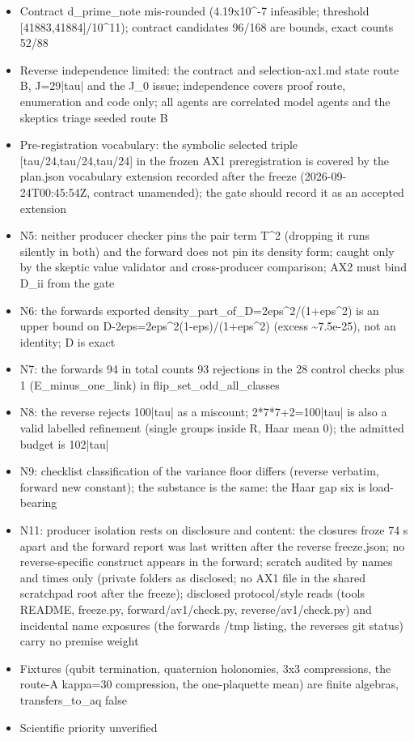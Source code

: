 \begin{gatequote}
\begin{itemize}
constant
\item Contract d\_prime\_note mis-rounded (4.19x10\textasciicircum{}-7
infeasible; threshold [41883,41884]/10\textasciicircum{}11); contract
candidates 96/168 are bounds, exact counts 52/88
\item Reverse independence limited: the contract and selection-ax1.md state
route B, J\textquotesingle{}=29|tau| and the J\_0 issue; independence covers
proof route, enumeration and code only; all agents are correlated model agents
and the skeptic\textquotesingle{}s triage seeded route B
\item Pre-registration vocabulary: the symbolic selected triple
[\textquotesingle{}tau/24\textquotesingle{},\textquotesingle{}tau/24\textquotesingle{},\textquotesingle{}tau/24\textquotesingle{}]
in the frozen AX1 preregistration is covered by the plan.json vocabulary
extension recorded after the freeze (2026-09-24T00:45:54Z, contract
unamended); the gate should record it as an accepted extension
\item N5: neither producer checker pins the pair term
T\textquotesingle{}\textasciicircum{}2 (dropping it runs silently in both) and
the forward does not pin its density form; caught only by the skeptic value
validator and cross-producer comparison; AX2 must bind D\textquotesingle{}\_ii
from the gate
\item N6: the forward\textquotesingle{}s exported
density\_part\_of\_D=2eps\textasciicircum{}2/(1+eps\textasciicircum{}2) is an
upper bound on
D-2eps=2eps\textasciicircum{}2(1-eps)/(1+eps\textasciicircum{}2) (excess
\textasciitilde{}7.5e-25), not an identity; D is exact
\item N7: the forward\textquotesingle{}s \textquotesingle{}94 in
total\textquotesingle{} counts 93 rejections in the 28 control checks plus 1
(E\_minus\_one\_link) in flip\_set\_odd\_all\_classes
\item N8: the reverse rejects 100|tau| as a miscount; 2*7*7+2=100|tau| is also
a valid labelled refinement (single groups inside R, Haar mean 0); the
admitted budget is 102|tau|
\item N9: checklist classification of the variance floor differs (reverse
verbatim, forward new constant); the substance is the same: the Haar gap six
is load-bearing
\item N11: producer isolation rests on disclosure and content: the closures
froze 74 s apart and the forward report was last written after the reverse
freeze.json; no reverse-specific construct appears in the forward; scratch
audited by names and times only (private folders as disclosed; no AX1 file in
the shared scratchpad root after the freeze); disclosed protocol/style reads
(tools README, freeze.py, forward/av1/check.py, reverse/av1/check.py) and
incidental name exposures (the forward\textquotesingle{}s /tmp listing, the
reverse\textquotesingle{}s git status) carry no premise weight
\item Fixtures (qubit termination, quaternion holonomies, 3x3 compressions,
the route-A kappa=30 compression, the one-plaquette mean) are finite algebras,
transfers\_to\_aq false
\item Scientific priority unverified
\end{itemize}
\end{gatequote}
